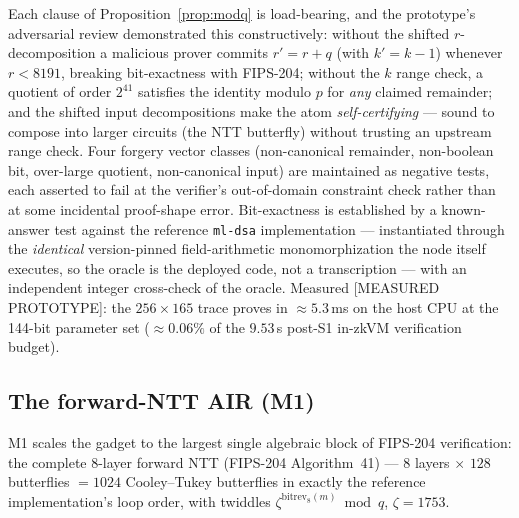 \documentclass[11pt]{article}
\newcommand{\code}[1]{\texttt{#1}}
\newcommand{\statusM}{\textcolor{statblue}{\textsf{\scriptsize[MEASURED PROTOTYPE]}}}
\theoremstyle{plain}
\theoremstyle{definition}
\theoremstyle{remark}
\begin{document}
Each clause of Proposition~\ref{prop:modq} is load-bearing, and the
prototype's adversarial review demonstrated this constructively: without
the shifted $r$-decomposition a malicious prover commits $r' = r + q$ (with
$k' = k - 1$) whenever $r < 8191$, breaking bit-exactness with FIPS-204;
without the $k$ range check, a quotient of order $2^{41}$ satisfies the
identity modulo $p$ for \emph{any} claimed remainder; and the shifted input
decompositions make the atom \emph{self-certifying} --- sound to compose
into larger circuits (the NTT butterfly) without trusting an upstream range
check. Four forgery vector classes (non-canonical remainder, non-boolean
bit, over-large quotient, non-canonical input) are maintained as negative
tests, each asserted to fail at the verifier's out-of-domain constraint
check rather than at some incidental proof-shape error. Bit-exactness is
established by a known-answer test against the reference \code{ml-dsa}
implementation --- instantiated through the \emph{identical} version-pinned
field-arithmetic monomorphization the node itself executes, so the oracle
is the deployed code, not a transcription --- with an independent integer
cross-check of the oracle. Measured \statusM{}: the $256 \times 165$ trace
proves in $\approx 5.3$\,ms on the host CPU at the 144-bit parameter set
($\approx 0.06\%$ of the $9.53$\,s post-S1 in-zkVM verification budget).

\subsection{The forward-NTT AIR (M1)}
\label{sec:air-ntt}

M1 scales the gadget to the largest single algebraic block of FIPS-204
verification: the complete 8-layer forward NTT (FIPS-204 Algorithm~41) ---
$8$ layers $\times$ $128$ butterflies $= 1024$ Cooley--Tukey butterflies in
exactly the reference implementation's loop order, with twiddles
$\zeta^{\mathrm{bitrev}_8(m)} \bmod q$, $\zeta = 1753$.
\end{document}
